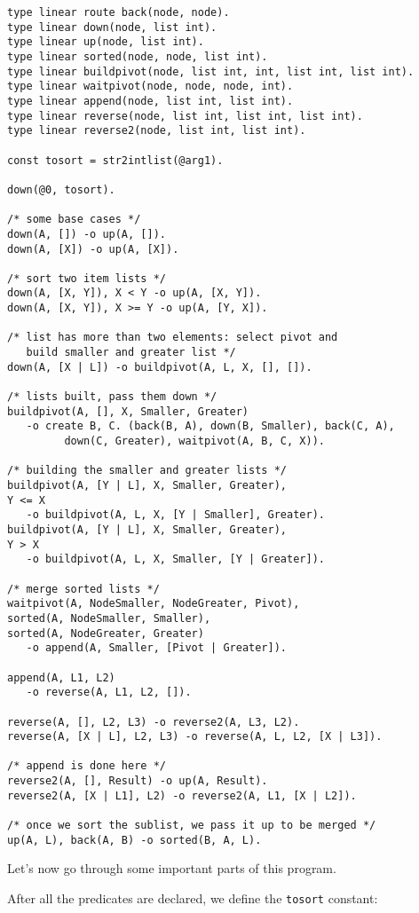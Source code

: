 \documentclass[11pt]{article}
\begin{document}
\begin{verbatim}
type linear route back(node, node).
type linear down(node, list int).
type linear up(node, list int).
type linear sorted(node, node, list int).
type linear buildpivot(node, list int, int, list int, list int).
type linear waitpivot(node, node, node, int).
type linear append(node, list int, list int).
type linear reverse(node, list int, list int, list int).
type linear reverse2(node, list int, list int).

const tosort = str2intlist(@arg1).

down(@0, tosort).

/* some base cases */
down(A, []) -o up(A, []).
down(A, [X]) -o up(A, [X]).

/* sort two item lists */
down(A, [X, Y]), X < Y -o up(A, [X, Y]).
down(A, [X, Y]), X >= Y -o up(A, [Y, X]).

/* list has more than two elements: select pivot and
   build smaller and greater list */
down(A, [X | L]) -o buildpivot(A, L, X, [], []).

/* lists built, pass them down */
buildpivot(A, [], X, Smaller, Greater)
   -o create B, C. (back(B, A), down(B, Smaller), back(C, A),
         down(C, Greater), waitpivot(A, B, C, X)).

/* building the smaller and greater lists */
buildpivot(A, [Y | L], X, Smaller, Greater),
Y <= X
   -o buildpivot(A, L, X, [Y | Smaller], Greater).
buildpivot(A, [Y | L], X, Smaller, Greater),
Y > X
   -o buildpivot(A, L, X, Smaller, [Y | Greater]).

/* merge sorted lists */
waitpivot(A, NodeSmaller, NodeGreater, Pivot),
sorted(A, NodeSmaller, Smaller),
sorted(A, NodeGreater, Greater)
   -o append(A, Smaller, [Pivot | Greater]).

append(A, L1, L2)
   -o reverse(A, L1, L2, []).

reverse(A, [], L2, L3) -o reverse2(A, L3, L2).
reverse(A, [X | L], L2, L3) -o reverse(A, L, L2, [X | L3]).

/* append is done here */
reverse2(A, [], Result) -o up(A, Result).
reverse2(A, [X | L1], L2) -o reverse2(A, L1, [X | L2]).

/* once we sort the sublist, we pass it up to be merged */
up(A, L), back(A, B) -o sorted(B, A, L).
\end{verbatim}

Let's now go through some important parts of this program.

After all the predicates are declared, we define the \texttt{tosort} constant:
\end{document}
